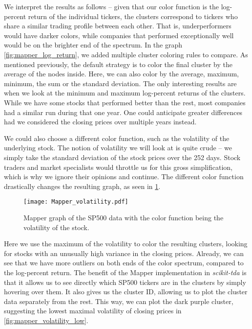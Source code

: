 We interpret the results as follows -- given that our color function is the log-percent return of the individual tickers, the clusters correspond to tickers who share a similar trading profile between each other. That is, underperformers would have darker colors, while companies that performed exceptionally well would be on the brighter end of the spectrum. In the graph \ref{fig:mapper_log_return}, we added multiple cluster coloring rules to compare. As mentioned previously, the default strategy is to color the final cluster by the average of the nodes inside. Here, we can also color by the average, maximum, minimum, the sum or the standard deviation. The only interesting results are when we look at the minimum and maximum log-percent returns of the clusters. While we have some stocks that performed better than the rest, most companies had a similar run during that one year. One could anticipate greater differences had we considered the closing prices over multiple years instead.

We could also choose a different color function, such as the volatility of the underlying stock. The notion of volatility we will look at is quite crude -- we simply take the standard deviation of the stock prices over the 252 days. Stock traders and market specialists would throttle us for this gross simplification, which is why we ignore their opinions and continue. The different color function drastically changes the resulting graph, as seen in \ref{fig:mapper_volatility}.

\begin{figure}[h!]
  \centering
  \texttt{[image: Mapper\_volatility.pdf]}
  \caption{Mapper graph of the SP500 data with the color function being the volatility of the stock.}
  \label{fig:mapper_volatility}
\end{figure}

Here we use the maximum of the volatility to color the resulting clusters, looking for stocks with an unusually high variance in the closing prices. Already, we can see that we have more outliers on both ends of the color spectrum, compared to the log-percent return. The benefit of the Mapper implementation in \textit{scikit-tda} is that it allows us to see directly which SP500 tickers are in the clusters by simply hovering over them. It also gives us the cluster ID, allowing us to plot the cluster data separately from the rest. This way, we can plot the dark purple cluster, suggesting the lowest maximal volatility of closing prices in \ref{fig:mapper_volatility_low}.

